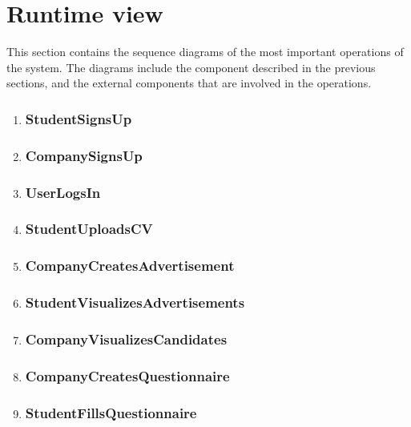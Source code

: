 \section{Runtime view}

This section contains the sequence diagrams of the most important operations of the system.
The diagrams include the component described in the previous sections, and the external components that are involved in the operations.

\begin{enumerate}[label=\textbf{RV\arabic* -}]

\item \subsubsection{StudentSignsUp}
\item \subsubsection{CompanySignsUp}
\item \subsubsection{UserLogsIn}
\item \subsubsection{StudentUploadsCV}
\item \subsubsection{CompanyCreatesAdvertisement}
\item \subsubsection{StudentVisualizesAdvertisements}
\item \subsubsection{CompanyVisualizesCandidates}
\item \subsubsection{CompanyCreatesQuestionnaire}
\item \subsubsection{StudentFillsQuestionnaire}

\end{enumerate}
